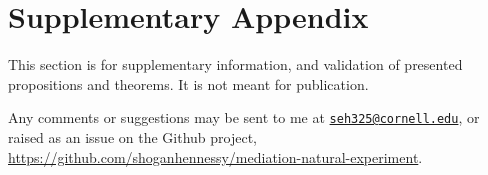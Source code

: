 \onehalfspacing
\appendix
\setcounter{table}{0}
\renewcommand{\thetable}{A\arabic{table}}
\setcounter{figure}{0}
\renewcommand{\thefigure}{A\arabic{figure}}

\section{Supplementary Appendix}
\label{appendix}
This section is for supplementary information, and validation of presented propositions and theorems.
It is not meant for publication.

Any comments or suggestions may be sent to me at \href{mailto:seh325@cornell.edu}{\nolinkurl{seh325@cornell.edu}},
or raised as an issue on the Github project,
\url{https://github.com/shoganhennessy/mediation-natural-experiment}.

